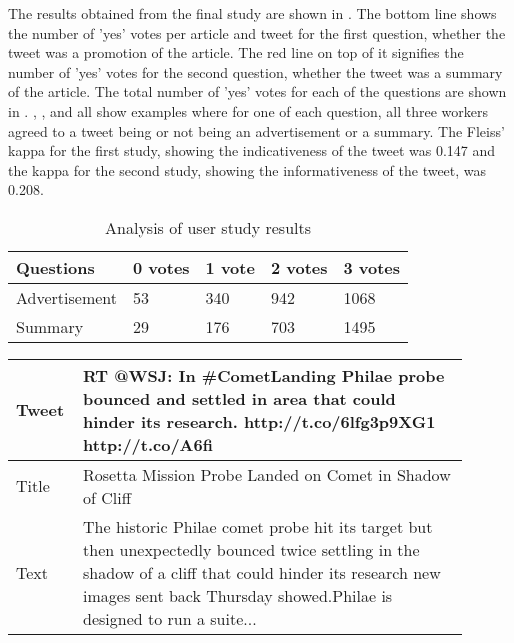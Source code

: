 The results obtained from the final study are shown in . The bottom line shows the number of 'yes' votes per article and tweet for the first question, whether the tweet was a promotion of the article. The red line on top of it signifies the number of 'yes' votes for the second question, whether the tweet was a summary of the article. The total number of 'yes' votes for each of the questions are shown in . , ,  and  all show examples where for one of each question, all three workers agreed to a tweet being or not being an advertisement or a summary. The Fleiss' kappa for the first study, showing the indicativeness of the tweet was 0.147 and the kappa for the second study, showing the informativeness of the tweet, was 0.208.

\begin{table}[!htbp]
\centering
\caption{Analysis of user study results}
\label{tab:yeses}
\begin{tabular}{|l|l|l|l|l|}
\hline
Questions     & 0 votes & 1 vote & 2 votes & 3 votes \\ \hline
Advertisement & 53    & 340    & 942     &  1068  \\ \hline
Summary       & 29     & 176    & 703     & 1495    \\ \hline
\end{tabular}
\end{table}


\begin{table}[!htbp]
\centering
\begin{tabular}{|p{0.1\linewidth}|p{0.8\linewidth}|}
\hline
Tweet &   RT @WSJ: In \#CometLanding Philae probe bounced and settled in area that could hinder its research. http://t.co/6lfg3p9XG1 http://t.co/A6fi  \\ \hline
Title &   Rosetta Mission Probe Landed on Comet in Shadow of Cliff	                                                                                 \\ \hline
Text  &  The historic Philae comet probe hit its target but then unexpectedly bounced twice settling in the shadow of a cliff that could hinder its research new images sent back Thursday showed.Philae is designed to run a suite...                                                                                         \\ \hline
\end{tabular}
\label{tab:exq1no}
\end{table}


